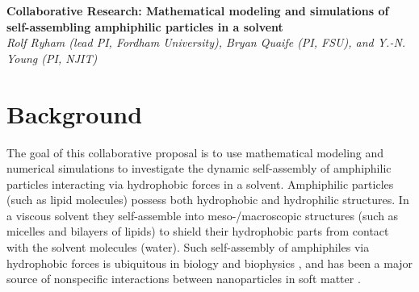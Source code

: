 \noindent
{\bf Collaborative Research: Mathematical modeling and simulations of
self-assembling amphiphilic particles in a solvent} \\
{\em Rolf Ryham (lead PI, Fordham University), Bryan Quaife (PI,
FSU), and Y.-N. Young (PI, NJIT)}
\section{Background}
\label{sec:background}
The goal of this collaborative proposal is to use mathematical modeling
and numerical simulations to investigate the dynamic self-assembly of
amphiphilic particles interacting via hydrophobic forces
in a solvent. Amphiphilic particles (such as lipid molecules) possess
both hydrophobic and hydrophilic structures. In a viscous solvent they
self-assemble into meso-/macroscopic structures (such as micelles and
bilayers of lipids) to shield their hydrophobic parts from contact with
the solvent molecules (water).
%
%
Such self-assembly of amphiphiles via hydrophobic forces is ubiquitous in biology and biophysics \cite{Israelachvili1954},
and has been a major source of nonspecific interactions between
nanoparticles in soft matter
\cite{Sanchez-IglesiasEtAl2012_ACSNano,AltantzisEtAl2013_PSC,XieYangLuEtAl2020_COCIS}. 



